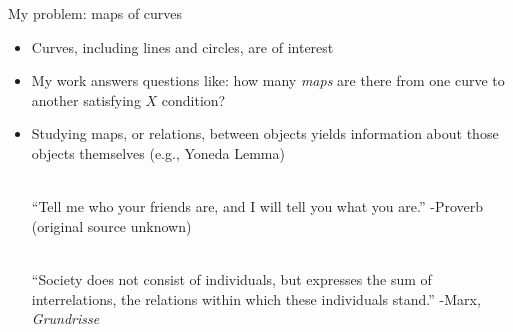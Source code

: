 \documentclass{beamer}
\theoremstyle{definition}
\begin{document}
                                                \begin{frame}{My problem: maps of curves}

                                                  \begin{itemize}
                                                  \item Curves, including lines and circles, are of interest
                                                  \item My work answers questions like: how many {\it maps} are there from one curve to another satisfying
                                                    $X$ condition?
                                                  \item Studying maps, or relations, between objects yields information about those objects themselves (e.g., Yoneda Lemma)
                                                    
                                                    ~\\

                                                      ``Tell me who your friends are, and I will tell you what you are.'' -Proverb (original source unknown)

                                                    ~\\
                                                    
                                                      ``Society does not consist of individuals, but expresses the sum of interrelations,
                                                      the relations within which these individuals stand.'' -Marx, {\it Grundrisse}
                                                  \end{itemize}
                                                \end{frame}
\end{document}
